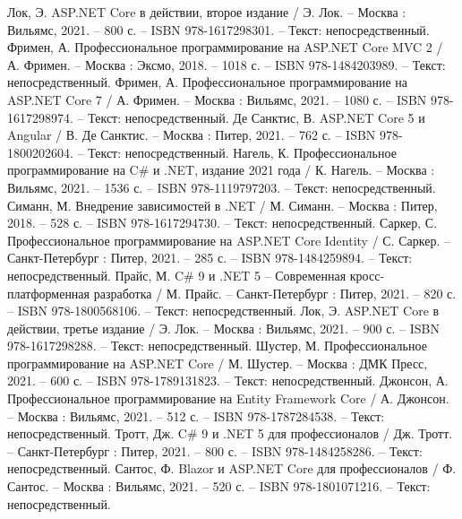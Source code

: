
\begin{thebibliography}{9}
	 Лок, Э. ASP.NET Core в действии, второе издание / Э. Лок. – Москва : Вильямс, 2021. – 800 с. – ISBN 978-1617298301. – Текст: непосредственный.
	 Фримен, А. Профессиональное программирование на ASP.NET Core MVC 2 / А. Фримен. – Москва : Эксмо, 2018. – 1018 с. – ISBN 978-1484203989. – Текст: непосредственный.
	 Фримен, А. Профессиональное программирование на ASP.NET Core 7 / А. Фримен. – Москва : Вильямс, 2021. – 1080 с. – ISBN 978-1617298974. – Текст: непосредственный.
	 Де Санктис, В. ASP.NET Core 5 и Angular / В. Де Санктис. – Москва : Питер, 2021. – 762 с. – ISBN 978-1800202604. – Текст: непосредственный.
	 Нагель, К. Профессиональное программирование на C\# и .NET, издание 2021 года / К. Нагель. – Москва : Вильямс, 2021. – 1536 с. – ISBN 978-1119797203. – Текст: непосредственный.
	 Симанн, М. Внедрение зависимостей в .NET / М. Симанн. – Москва : Питер, 2018. – 528 с. – ISBN 978-1617294730. – Текст: непосредственный.
	 Саркер, С. Профессиональное программирование на ASP.NET Core Identity / С. Саркер. – Санкт-Петербург  : Питер, 2021. – 285 с. – ISBN 978-1484259894. – Текст: непосредственный.
	 Прайс, М. C\# 9 и .NET 5 – Современная кросс-платформенная разработка / М. Прайс. – Санкт-Петербург  : Питер, 2021. – 820 с. – ISBN 978-1800568106. – Текст: непосредственный.
	 Лок, Э. ASP.NET Core в действии, третье издание / Э. Лок. – Москва : Вильямс, 2021. – 900 с. – ISBN 978-1617298288. – Текст: непосредственный.
	 Шустер, М. Профессиональное программирование на ASP.NET Core / М. Шустер. – Москва : ДМК Пресс, 2021. – 600 с. – ISBN 978-1789131823. – Текст: непосредственный.
	 Джонсон, А. Профессиональное программирование на Entity Framework Core / А. Джонсон. – Москва : Вильямс, 2021. – 512 с. – ISBN 978-1787284538. – Текст: непосредственный.
	 Тротт, Дж. C\# 9 и .NET 5 для профессионалов / Дж. Тротт. – Санкт-Петербург  : Питер, 2021. – 800 с. – ISBN 978-1484258286. – Текст: непосредственный.
	 Сантос, Ф. Blazor и ASP.NET Core для профессионалов / Ф. Сантос. – Москва : Вильямс, 2021. – 520 с. – ISBN 978-1801071216. – Текст: непосредственный.

\end{thebibliography}
